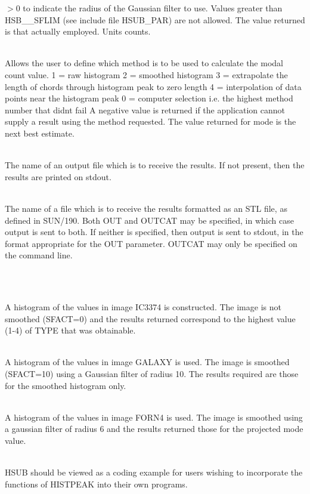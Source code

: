 \documentclass[twoside,11pt]{article}
\newlength{\sstexampleslength}
\newcommand{\sstexamples}[1]{
   \item[Examples:] \mbox{} \\
   \vspace{-3.5ex}
   \begin{description}
      #1
   \end{description}
}
\newcommand{\sstsubsection}[1]{ \item[{#1}] \mbox{} \\}
\newcommand{\sstexamplesubsection}[2]{\sloppy
\item[\parbox{\sstexampleslength}{\ssttt #1}] \mbox{} \vspace{1.0ex}
\\ #2 }
\newcommand{\sstnotes}[1]{\item[Notes:] \mbox{} \\[1.3ex] #1}
\newcommand{\sstitem}{\item}
\newcommand{\sstexamples}[1]{
      \item[Examples:] \\
      \begin{description}
         #1
      \end{description}
      \\
   }
\newcommand{\sstsubsection}[1]{\item[{#1}]}
\newcommand{\sstexamplesubsection}[2]{\item[{\ssttt #1}] #2}
\newcommand{\sstnotes}[1]{\item[Notes:] #1 }
\newcommand{\sstitem}{\item}
\begin{document}
{{{{            \sstitem
            $>$0 to indicate the radius of the Gaussian filter to use.
            Values greater than HSB\_\_SFLIM (see include file HSUB\_PAR)
            are not allowed. The value returned is that actually
            employed. Units counts.
         }
      }
      \sstsubsection{
         TYPE = \_INTEGER (Read)
      }{
         Allows the user to define which method is to be used to
         calculate the modal count value.
         1 = raw histogram
         2 = smoothed histogram
         3 = extrapolate the length of chords through histogram peak
             to zero length
         4 = interpolation of data points near the histogram peak
         0 = computer selection i.e. the highest method number that
             didnt fail
         A negative value is returned if the application cannot supply a
         result using the method requested. The value returned for
         mode is the next best estimate.
      }
      \sstsubsection{
         OUT = \_CHAR (Read)
      }{
         The name of an output file which is to receive the results.  If
         not present, then the results are printed on stdout.
      }
      \sstsubsection{
         OUTCAT = \_CHAR (Read)
      }{
         The name of a file which is to receive the results formatted as
         an STL file, as defined in SUN/190.  Both OUT and OUTCAT may be
         specified, in which case output is sent to both.  If neither
         is specified, then output is sent to stdout, in the format
         appropriate for the OUT parameter.  OUTCAT may only be
         specified on the command line.
      }
   }
   \sstexamples{
      \sstexamplesubsection{
         hsub in=ic3374 sfact=0 type=0
      }{
         A histogram of the values in image IC3374 is constructed.
         The image is not smoothed (SFACT=0) and the results returned
         correspond to the highest value (1-4) of TYPE that was
         obtainable.
      }
      \sstexamplesubsection{
         hsub in=galaxy sfact=10 type=4
      }{
         A histogram of the values in image GALAXY is used. The image
         is smoothed (SFACT=10) using a Gaussian filter of radius 10.
         The results required are those for the smoothed histogram
         only.
      }
      \sstexamplesubsection{
         hsub in=forn4 sfact=6 type=3 outcat=hsub.txt
      }{
         A histogram of the values in image FORN4 is used. The image
         is smoothed using a gaussian filter of radius 6 and the
         results returned those for the projected mode value.
      }
   }
   \sstnotes{
      HSUB should be viewed as a coding example for users wishing
      to incorporate the functions of HISTPEAK into their own
      programs.

}}
\end{document}

